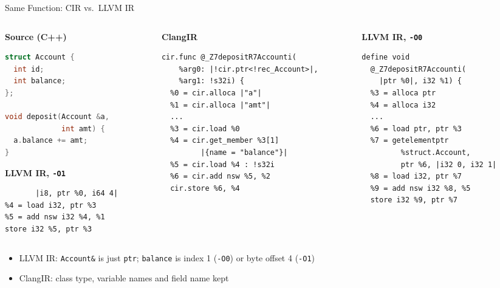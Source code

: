 \documentclass[aspectratio=169,10pt]{beamer}
\newcommand{\code}[1]{\texttt{#1}}
\begin{document}
\begin{frame}[fragile]{Same Function: CIR vs.\ LLVM IR}
  \begin{columns}[T]
    \begin{column}{0.29\textwidth}
      \textbf{Source (C++)}
\begin{lstlisting}[language=C++]
struct Account {
  int id;
  int balance;
};

void deposit(Account &a,
             int amt) {
  a.balance += amt;
}
\end{lstlisting}
      \vspace{0.3em}
      \textbf{LLVM IR, \code{-O1}}
\begin{lstlisting}[language=LLVMIR]
%3 = getelementptr
       |i8, ptr %0, i64 4|
%4 = load i32, ptr %3
%5 = add nsw i32 %4, %1
store i32 %5, ptr %3
\end{lstlisting}
    \end{column}
    \begin{column}{0.37\textwidth}
      \textbf{ClangIR}
\begin{lstlisting}[language=CIR]
cir.func @_Z7depositR7Accounti(
    %arg0: |!cir.ptr<!rec_Account>|,
    %arg1: !s32i) {
  %0 = cir.alloca |"a"|
  %1 = cir.alloca |"amt"|
  ...
  %3 = cir.load %0
  %4 = cir.get_member %3[1]
         |{name = "balance"}|
  %5 = cir.load %4 : !s32i
  %6 = cir.add nsw %5, %2
  cir.store %6, %4
\end{lstlisting}
    \end{column}
    \begin{column}{0.31\textwidth}
      \textbf{LLVM IR, \code{-O0}}
\begin{lstlisting}[language=LLVMIR]
define void
  @_Z7depositR7Accounti(
    |ptr %0|, i32 %1) {
  %3 = alloca ptr
  %4 = alloca i32
  ...
  %6 = load ptr, ptr %3
  %7 = getelementptr
         %struct.Account,
         ptr %6, |i32 0, i32 1|
  %8 = load i32, ptr %7
  %9 = add nsw i32 %8, %5
  store i32 %9, ptr %7
\end{lstlisting}
    \end{column}
  \end{columns}

  \vspace{0.4em}
  \small
  \begin{itemize}
    \item LLVM IR: \code{Account\&} is just \code{ptr}; \code{balance} is index 1 (\code{-O0}) or byte offset 4 (\code{-O1})
    \item ClangIR: class type, variable names and field name kept
  \end{itemize}
\end{frame}
\end{document}
